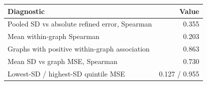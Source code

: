 \begin{tabular}{lr}
\toprule
Diagnostic & Value \\
\midrule
Pooled SD vs absolute refined error, Spearman & 0.355 \\
Mean within-graph Spearman & 0.203 \\
Graphs with positive within-graph association & 0.863 \\
Mean SD vs graph MSE, Spearman & 0.730 \\
Lowest-SD / highest-SD quintile MSE & 0.127 / 0.955 \\
\bottomrule
\end{tabular}
